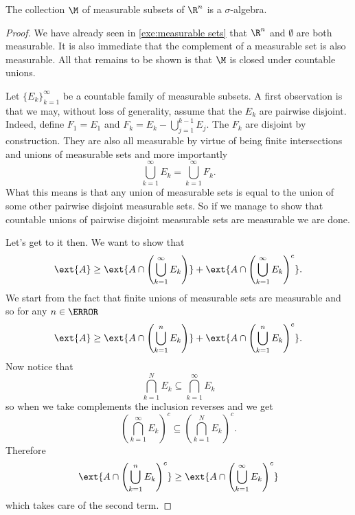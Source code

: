 \documentclass[12pt,oneside]{book}
\begin{document}
\begin{proposition}
	The collection \( \M \) of measurable subsets of \( \R^n \) is a \( \sigma \)-algebra.
\end{proposition}
\begin{proof}
	We have already seen in \cref{exe:measurable sets} that \( \R^n \) and \( \emptyset \) are both measurable. It is also immediate that the complement of a measurable set is also measurable. All that remains to be shown is that \( \M \) is closed under countable unions. 

	Let \( \{ E_k \}_{k = 1}^\infty \) be a countable family of measurable subsets. A first observation is that we may, without loss of generality, assume that the \( E_k \) are pairwise disjoint. Indeed, define \( F_1 = E_1 \) and \( F_k = E_{k} - \bigcup_{j = 1}^{k-1}E_j \). The \( F_k \) are disjoint by construction. They are also all measurable by virtue of being finite intersections and unions of measurable sets and more importantly
	\begin{equation*}
		\bigcup_{k = 1}^\infty E_k = \bigcup_{k = 1}^\infty	F_k.
	\end{equation*}
	What this means is that any union of measurable sets is equal to the union of some other pairwise disjoint measurable sets. So if we manage to show that countable unions of pairwise disjoint measurable sets are measurable we are done. 

	Let's get to it then. We want to show that
	\begin{equation*}
		\ext{A} \geq \ext{A \cap \left(\bigcup_{k = 1}^\infty E_k\right)} + \ext{A \cap \left(\bigcup_{k = 1}^\infty E_k\right)^c}.
	\end{equation*}
	We start from the fact that finite unions of measurable sets are measurable and so for any \( n \in \N \)
	\begin{equation*}
		\ext{A} \geq \ext{A \cap \left(\bigcup_{k = 1}^n E_k\right)} + \ext{A \cap \left(\bigcup_{k = 1}^n E_k\right)^c}.
	\end{equation*}
	Now notice that 	
	\begin{equation*}
		\bigcap_{k = 1}^N E_k \subseteq \bigcap_{k = 1}^\infty E_k
	\end{equation*}
	so when we take complements the inclusion reverses and we get
	\begin{equation*}
		\left(\bigcap_{k = 1}^\infty E_k\right)^c \subseteq \left(\bigcap_{k = 1}^N E_k\right)^c.
	\end{equation*}
	Therefore
	\begin{equation*}
		\ext{A \cap \left(\bigcup_{k = 1}^n E_k\right)^c} \geq \ext{A \cap \left(\bigcup_{k = 1}^\infty E_k\right)^c}
	\end{equation*}
	which takes care of the second term.


\end{proof}
\end{document}
